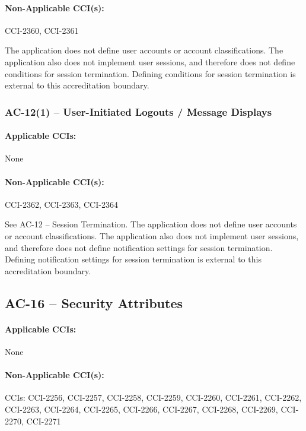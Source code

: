 \documentclass[letterpaper, 10pt, twoside]{article}
\begin{document}
\paragraph{Non-Applicable CCI(s):} CCI-2360, CCI-2361

The application does not define user accounts or account classifications. The application also does not implement user sessions, and therefore does not define conditions for session termination. Defining conditions for session termination is external to this accreditation boundary.

\subsubsection{AC-12(1) -- User-Initiated Logouts / Message Displays}

\paragraph{Applicable CCIs:} None

\paragraph{Non-Applicable CCI(s):} CCI-2362, CCI-2363, CCI-2364

See AC-12 – Session Termination. The application does not define user accounts or account classifications. The application also does not implement user sessions, and therefore does not define notification settings for session termination. Defining notification settings for session termination is external to this accreditation boundary.

\subsection{AC-16 -- Security Attributes}

\paragraph{Applicable CCIs:} None

\paragraph{Non-Applicable CCI(s):} CCIs: CCI-2256, CCI-2257, CCI-2258, CCI-2259, CCI-2260, CCI-2261, CCI-2262, CCI-2263, CCI-2264, CCI-2265, CCI-2266, CCI-2267, CCI-2268, CCI-2269, CCI-2270, CCI-2271
\end{document}
